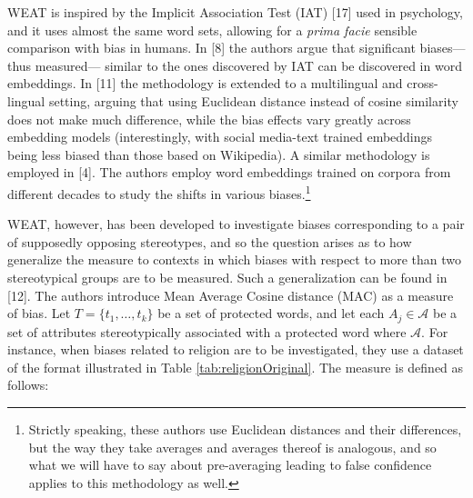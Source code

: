 \documentclass[
  10pt,
  dvipsnames,enabledeprecatedfontcommands]{scrartcl}
\begin{document}
WEAT is inspired by the Implicit Association Test (IAT) {[}17{]} used in
psychology, and it uses almost the same word sets, allowing for a
\emph{prima facie} sensible comparison with bias in humans. In {[}8{]}
the authors argue that significant biases---thus measured--- similar to
the ones discovered by IAT can be discovered in word embeddings. In
{[}11{]} the methodology is extended to a multilingual and cross-lingual
setting, arguing that using Euclidean distance instead of cosine
similarity does not make much difference, while the bias effects vary
greatly across embedding models (interestingly, with social media-text
trained embeddings being less biased than those based on Wikipedia). A
similar methodology is employed in {[}4{]}. The authors employ word
embeddings trained on corpora from different decades to study the shifts
in various biases.\footnote{Strictly speaking, these authors use
  Euclidean distances and their differences, but the way they take
  averages and averages thereof is analogous, and so what we will have
  to say about pre-averaging leading to false confidence applies to this
  methodology as well.}

WEAT, however, has been developed to investigate biases corresponding to
a pair of supposedly opposing stereotypes, and so the question arises as
to how generalize the measure to contexts in which biases with respect
to more than two stereotypical groups are to be measured. Such a
generalization can be found in {[}12{]}. The authors introduce Mean
Average Cosine distance (MAC) as a measure of bias. Let
\(T = \{t_1, \dots, t_k\}\) be a set of protected words, and let each
\(A_j\in \mathcal{A}\) be a set of attributes stereotypically associated
with a protected word where \(\mathcal{A}\). For instance, when biases
related to religion are to be investigated, they use a dataset of the
format illustrated in Table \ref{tab:religionOriginal}. The measure is
defined as follows:
\end{document}
